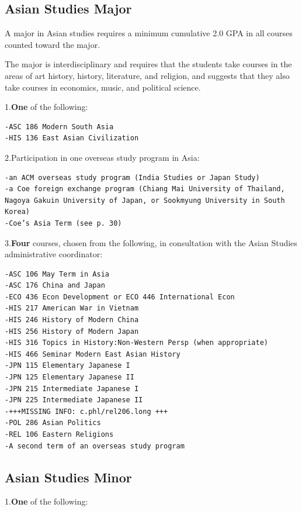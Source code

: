 \documentclass[
  letterpaper,
]{scrbook}
\begin{document}
\subsection{Asian Studies Major}\label{asian-studies-major}

A major in Asian studies requires a minimum cumulative 2.0 GPA in all
courses counted toward the major.

The major is interdisciplinary and requires that the students take
courses in the areas of art history, history, literature, and religion,
and suggests that they also take courses in economics, music, and
political science.

1.\textbf{One} of the following:

\begin{verbatim}
-ASC 186 Modern South Asia
-HIS 136 East Asian Civilization
\end{verbatim}

2.Participation in one overseas study program in Asia:

\begin{verbatim}
-an ACM overseas study program (India Studies or Japan Study)
-a Coe foreign exchange program (Chiang Mai University of Thailand, Nagoya Gakuin University of Japan, or Sookmyung University in South Korea)
-Coe’s Asia Term (see p. 30)
\end{verbatim}

3.\textbf{Four} courses, chosen from the following, in consultation with
the Asian Studies administrative coordinator:

\begin{verbatim}
-ASC 106 May Term in Asia
-ASC 176 China and Japan
-ECO 436 Econ Development or ECO 446 International Econ
-HIS 217 American War in Vietnam
-HIS 246 History of Modern China
-HIS 256 History of Modern Japan
-HIS 316 Topics in History:Non-Western Persp (when appropriate)
-HIS 466 Seminar Modern East Asian History
-JPN 115 Elementary Japanese I
-JPN 125 Elementary Japanese II
-JPN 215 Intermediate Japanese I
-JPN 225 Intermediate Japanese II
-+++MISSING INFO: c.phl/rel206.long +++
-POL 286 Asian Politics
-REL 106 Eastern Religions
-A second term of an overseas study program
\end{verbatim}

\subsection{Asian Studies Minor}\label{asian-studies-minor}

1.\textbf{One} of the following:
\end{document}
